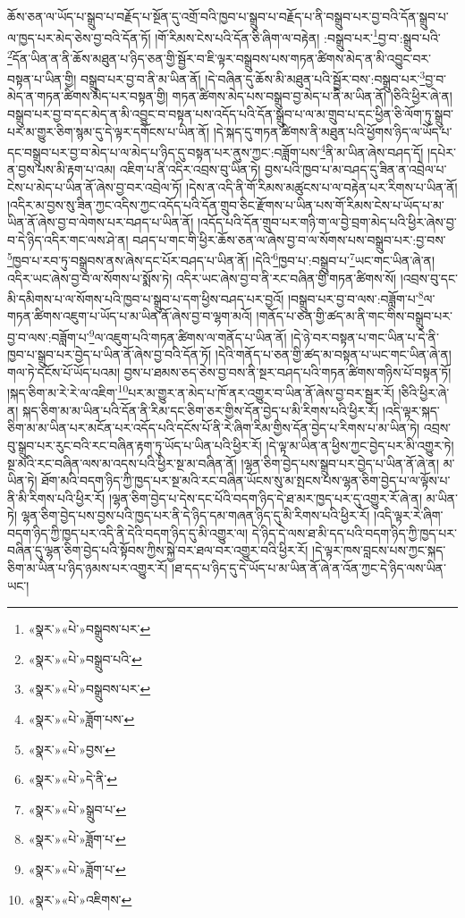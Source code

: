ཆོས་ཅན་ལ་ཡོད་པ་སྒྲུབ་པ་བརྗོད་པ་སྔོན་དུ་འགྲོ་བའི་ཁྱབ་པ་སྒྲུབ་པ་བརྗོད་པ་ནི་བསྒྲུབ་པར་བྱ་བའི་དོན་སྒྲུབ་པ་ལ་ཁྱད་པར་མེད་ཅེས་བྱ་བའི་དོན་ཏོ། །གོ་རིམས་ངེས་པའི་དོན་ཅི་ཞིག་ལ་བརྟེན། :བསྒྲུབ་པར་\footnote{«སྣར་»«པེ་»བསྒྲུབས་པར་}བྱ་བ་:སྒྲུབ་པའི་\footnote{«སྣར་»«པེ་»བསྒྲུབ་པའི་}དོན་ཡིན་ན་ནི་ཆོས་མཐུན་པ་ཉིད་ཅན་གྱི་སྦྱོར་བ་ཇི་ལྟར་བསྒྲུབས་པས་གཏན་ཚིགས་མེད་ན་མི་འབྱུང་བར་བསྟན་པ་ཡིན་གྱི། བསྒྲུབ་པར་བྱ་བ་ནི་མ་ཡིན་ནོ། །དེ་བཞིན་དུ་ཆོས་མི་མཐུན་པའི་སྦྱོར་བས་:བསྒྲུབ་པར་\footnote{«སྣར་»«པེ་»བསྒྲུབས་པར་}བྱ་བ་མེད་ན་གཏན་ཚིགས་མེད་པར་བསྟན་གྱི། གཏན་ཚིགས་མེད་པས་བསྒྲུབ་བྱ་མེད་པ་ནི་མ་ཡིན་ནོ། །ཅིའི་ཕྱིར་ཞེ་ན། བསྒྲུབ་པར་བྱ་བ་དང་མེད་ན་མི་འབྱུང་བ་བསྟན་པས་འདོད་པའི་དོན་སྒྲུབ་པ་ལ་མ་གྲུབ་པ་དང་ཕྱིན་ཅི་ལོག་ཏུ་སྒྲུབ་པར་མ་གྱུར་ཅིག་སྙམ་དུ་དེ་ལྟར་དགོངས་པ་ཡིན་ནོ། །དེ་སྐད་དུ་གཏན་ཚིགས་ནི་མཐུན་པའི་ཕྱོགས་ཉིད་ལ་ཡོད་པ་དང་བསྒྲུབ་པར་བྱ་བ་མེད་པ་ལ་མེད་པ་ཉིད་དུ་བསྟན་པར་ནུས་ཀྱང་:བཟློག་པས་\footnote{«སྣར་»«པེ་»ཟློག་པས་}ནི་མ་ཡིན་ཞེས་བཤད་དོ། །དཔེར་ན་བྱས་པས་མི་རྟག་པ་འམ། འཇིག་པ་ནི་འདིར་འབྲས་བུ་ཡིན་ཏེ། བྱས་པའི་ཁྱབ་པ་མ་བཤད་དུ་ཟིན་ན་འབྲེལ་པ་ངེས་པ་མེད་པ་ཡིན་ནོ་ཞེས་བྱ་བར་འབྲེལ་ཏོ། །དེས་ན་འདི་ནི་གོ་རིམས་མཚུངས་པ་ལ་བརྟེན་པར་རིགས་པ་ཡིན་ནོ། །འདིར་མ་བྱས་སུ་ཟིན་ཀྱང་འདིས་ཀྱང་འདོད་པའི་དོན་གྲུབ་ཅིང་རྫོགས་པ་ཡིན་པས་གོ་རིམས་ངེས་པ་ཡོད་པ་མ་ཡིན་ནོ་ཞེས་བྱ་བ་ལེགས་པར་བཤད་པ་ཡིན་ནོ། །འདོད་པའི་དོན་གྲུབ་པར་གཉི་ག་ལ་བྱེ་བྲག་མེད་པའི་ཕྱིར་ཞེས་བྱ་བ་དེ་ཉིད་འདིར་གང་ལས་ཤེ་ན། བཤད་པ་གང་གི་ཕྱིར་ཆོས་ཅན་ལ་ཞེས་བྱ་བ་ལ་སོགས་པས་བསྒྲུབ་པར་:བྱ་བས་\footnote{«སྣར་»«པེ་»བྱས་}ཁྱབ་པ་རབ་ཏུ་བསྒྲུབས་ནས་ཞེས་དང་པོར་བཤད་པ་ཡིན་ནོ། །དེའི་\footnote{«སྣར་»«པེ་»དེ་ནི་}ཁྱབ་པ་:བསྒྲུབ་པ་\footnote{«སྣར་»«པེ་»སྒྲུབ་པ་}ཡང་གང་ཡིན་ཞེ་ན། འདིར་ཡང་ཞེས་བྱ་བ་ལ་སོགས་པ་སྨོས་ཏེ། འདིར་ཡང་ཞེས་བྱ་བ་ནི་རང་བཞིན་གྱི་གཏན་ཚིགས་སོ། །འབྲས་བུ་དང་མི་དམིགས་པ་ལ་སོགས་པའི་ཁྱབ་པ་སྒྲུབ་པ་དག་ཕྱིས་བཤད་པར་བྱའོ། །བསྒྲུབ་པར་བྱ་བ་ལས་:བཟློག་པ་\footnote{«སྣར་»«པེ་»ཟློག་པ་}ལ་གཏན་ཚིགས་འཇུག་པ་ཡོད་པ་མ་ཡིན་ནོ་ཞེས་བྱ་བ་ལྷག་མའོ། །གནོད་པ་ཅན་གྱི་ཚད་མ་ནི་གང་གིས་བསྒྲུབ་པར་བྱ་བ་ལས་:བཟློག་པ་\footnote{«སྣར་»«པེ་»ཟློག་པ་}ལ་འཇུག་པའི་གཏན་ཚིགས་ལ་གནོད་པ་ཡིན་ནོ། །དེ་ཉེ་བར་བསྟན་པ་གང་ཡིན་པ་དེ་ནི་ཁྱབ་པ་སྒྲུབ་པར་བྱེད་པ་ཡིན་ནོ་ཞེས་བྱ་བའི་དོན་ཏོ། །དེའི་གནོད་པ་ཅན་གྱི་ཚད་མ་བསྟན་པ་ཡང་གང་ཡིན་ཞེ་ན། གལ་ཏེ་དངོས་པོ་ཡོད་པའམ། བྱས་པ་ཐམས་ཅད་ཅེས་བྱ་བས་ནི་སྔར་བཤད་པའི་གཏན་ཚིགས་གཉིས་པོ་བསྟན་ཏོ། །སྐད་ཅིག་མ་རེ་རེ་ལ་འཇིག་\footnote{«སྣར་»«པེ་»འཇིགས་}པར་མ་གྱུར་ན་མེད་པ་ཁོ་ནར་འགྱུར་བ་ཡིན་ནོ་ཞེས་བྱ་བར་སྦྱར་རོ། །ཅིའི་ཕྱིར་ཞེ་ན། སྐད་ཅིག་མ་མ་ཡིན་པའི་དོན་ནི་རིམ་དང་ཅིག་ཅར་གྱིས་དོན་བྱེད་པ་མི་རིགས་པའི་ཕྱིར་རོ། །འདི་ལྟར་སྐད་ཅིག་མ་མ་ཡིན་པར་མངོན་པར་འདོད་པའི་དངོས་པོ་ནི་རེ་ཞིག་རིམ་གྱིས་དོན་བྱེད་པ་རིགས་པ་མ་ཡིན་ཏེ། འབྲས་བུ་སྒྲུབ་པར་རུང་བའི་རང་བཞིན་རྟག་ཏུ་ཡོད་པ་ཡིན་པའི་ཕྱིར་རོ། །དེ་ལྟ་མ་ཡིན་ན་ཕྱིས་ཀྱང་བྱེད་པར་མི་འགྱུར་ཏེ། སྔ་མའི་རང་བཞིན་ལས་མ་འདས་པའི་ཕྱིར་སྔ་མ་བཞིན་ནོ། །ལྷན་ཅིག་བྱེད་པས་སྒྲུབ་པར་བྱེད་པ་ཡིན་ནོ་ཞེ་ན། མ་ཡིན་ཏེ། ཐོག་མའི་བདག་ཉིད་ཀྱི་ཁྱད་པར་སྔ་མའི་རང་བཞིན་ཡོངས་སུ་མ་སྤངས་པས་ལྷན་ཅིག་བྱེད་པ་ལ་ལྟོས་པ་ནི་མི་རིགས་པའི་ཕྱིར་རོ། །ལྷན་ཅིག་བྱེད་པ་དེས་དང་པོའི་བདག་ཉིད་དེ་ཐ་མར་ཁྱད་པར་དུ་འགྱུར་རོ་ཞེ་ན། མ་ཡིན་ཏེ། ལྷན་ཅིག་བྱེད་པས་བྱས་པའི་ཁྱད་པར་ནི་དེ་ཉིད་དམ་གཞན་ཉིད་དུ་མི་རིགས་པའི་ཕྱིར་རོ། །འདི་ལྟར་རེ་ཞིག་བདག་ཉིད་ཀྱི་ཁྱད་པར་འདི་ནི་དེའི་བདག་ཉིད་དུ་མི་འགྱུར་ལ། དེ་ཉིད་དེ་ལས་ཐ་མི་དད་པའི་བདག་ཉིད་ཀྱི་ཁྱད་པར་བཞིན་དུ་ལྷན་ཅིག་བྱེད་པའི་སྟོབས་ཀྱིས་སྐྱེ་བར་ཐལ་བར་འགྱུར་བའི་ཕྱིར་རོ། །དེ་ལྟར་ཁས་བླངས་པས་ཀྱང་སྐད་ཅིག་མ་ཡིན་པ་ཉིད་ཉམས་པར་འགྱུར་རོ། །ཐ་དད་པ་ཉིད་དུ་དེ་ཡོད་པ་མ་ཡིན་ནོ་ཞེ་ན་འོན་ཀྱང་དེ་ཉིད་ལས་ཡིན་ཡང་། 